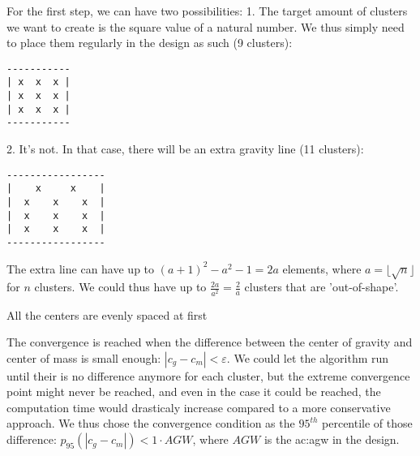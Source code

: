 For the first step, we can have two possibilities:
1. The target amount of clusters we want to create is the square value of a natural number.
We thus simply need to place them regularly in the design as such (9 clusters):
\begin{verbatim}
-----------
| x  x  x |
| x  x  x |
| x  x  x |
-----------
\end{verbatim}

2. It's not. In that case, there will be an extra gravity line (11 clusters):
\begin{verbatim}
-----------------
|    x     x    |
|  x    x    x  |
|  x    x    x  |
|  x    x    x  |
-----------------
\end{verbatim}
The extra line can have up to $(a+1)^2 - a^2 - 1 = 2a$ elements, where $a = \lfloor \sqrt{n} \rfloor$ for $n$ clusters.
We could thus have up to $\frac{2a}{a^2} = \frac{2}{a}$ clusters that are 'out-of-shape'.

All the centers are evenly spaced at first

The convergence is reached when the difference between the center of gravity and center of mass is small enough: $|c_g - c_m| < \varepsilon$.
We could let the algorithm run until their is no difference anymore for each cluster, but the extreme convergence point might never be reached, and even in the case it could be reached, the computation time would drasticaly increase compared to a more conservative approach.
We thus chose the convergence condition as the $95^{th}$ percentile of those difference: $p_{95}(|c_g - c_m|) < 1 \cdot AGW$, where $AGW$ is the \acrlong{ac:agw} in the design.
